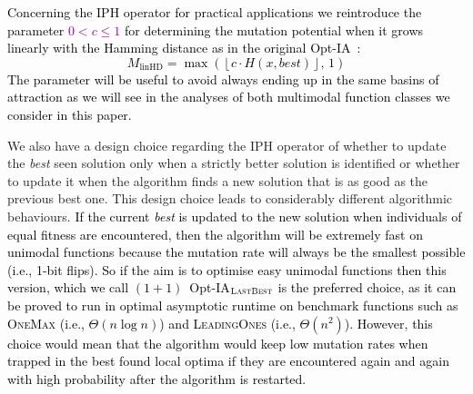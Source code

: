 \documentclass[lettersize,journal]{IEEEtran}
\newcommand{\rerev}[1]{\textcolor{purple}{#1}}
\begin{document}
\textcolor{black}{Concerning the IPH operator for practical applications we  reintroduce the parameter \rerev{$0 < c \leq 1$} for determining the mutation potential when it grows linearly with the Hamming distance as in the original Opt-IA~\cite{JansenZarges2011}:}  
 \textcolor{black}{
 $$M_{\text{linHD}} = \max\!\left(\left\lfloor c \cdot H(x,\mathit{best}) \right\rfloor,\, 1 \right)$$
 }
\textcolor{black}{The parameter will be useful to avoid always ending up in the same basins of attraction as we will see in the analyses of both multimodal function classes we consider in this paper.} 
 
{\color{black} We also have  a design choice regarding the IPH operator  of whether to update the {\it best} seen solution only when a strictly better solution is identified or whether to update it when the algorithm finds a new solution that is as good as the previous best one. 
This design choice leads to considerably different algorithmic behaviours.}
\textcolor{black}{If the current {\it best} is updated to the new solution when individuals of equal fitness are encountered,  then the algorithm will be extremely fast on unimodal functions because the mutation rate will always be the smallest possible (i.e., 1-bit flips). So if the aim is to optimise easy unimodal functions then this version, which we call $(1+1)$~Opt-IA$_{\textsc{LastBest}}$ is the preferred choice, as it can be proved to run in optimal asymptotic runtime on benchmark functions such as \textsc{OneMax} (i.e., $\Theta(n \log n)$) and \textsc{LeadingOnes} (i.e., $\Theta(n^2)$). However, this choice would mean that the algorithm would keep low mutation rates when trapped in the best found local optima if they are encountered again and again with high probability after the algorithm is restarted.}
\end{document}
